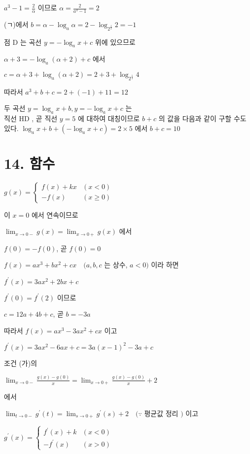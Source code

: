 \documentclass[10pt]{article}
\begin{document}
\(a^{3}-1=\frac{2}{\alpha}\) 이므로 \(\alpha=\frac{2}{a^{3}-1}=2\)

(ㄱ)에서 \(b=\alpha-\log _{a} \alpha=2-\log _{2^{\frac{1}{3}}} 2=-1\)

점 D 는 곡선 \(y=-\log _{a} x+c\) 위에 있으므로

\(\alpha+3=-\log _{a}(\alpha+2)+c\) 에서

\(c=\alpha+3+\log _{a}(\alpha+2)=2+3+\log _{2^{\frac{1}{3}}} 4\)

따라서 \(a^{3}+b+c=2+(-1)+11=12\)

두 곡선 \(y=\log _{a} x+b, y=-\log _{a} x+c\) 는\\
직선 HD , 곧 직선 \(y=5\) 에 대하여 대칭이므로 \(b+c\) 의 값을 다음과 같이 구할 수도 있다. \(\log _{a} x+b+\left(-\log _{a} x+c\right)=2 \times 5\) 에서 \(b+c=10\)

\section*{14. 함수}
\(g(x)= \begin{cases}f(x)+k x & (x<0) \\ -f(x) & (x \geq 0)\end{cases}\)

이 \(x=0\) 에서 연속이므로

\(\lim _{x \rightarrow 0-} g(x)=\lim _{x \rightarrow 0+} g(x)\) 에서

\(f(0)=-f(0)\), 곧 \(f(0)=0\)

\(f(x)=a x^{3}+b x^{2}+c x \quad(a, b, c\) 는 상수, \(a<0)\) 이라 하면

\(f^{\prime}(x)=3 a x^{2}+2 b x+c\)

\(f^{\prime}(0)=f^{\prime}(2)\) 이므로

\(c=12 a+4 b+c\), 곧 \(b=-3 a\)

따라서 \(f(x)=a x^{3}-3 a x^{2}+c x\) 이고

\(f^{\prime}(x)=3 a x^{2}-6 a x+c=3 a(x-1)^{2}-3 a+c\)

조건 (가)의

\(\lim _{x \rightarrow 0-} \frac{g(x)-g(0)}{x}=\lim _{x \rightarrow 0+} \frac{g(x)-g(0)}{x}+2\)

에서

\(\lim _{t \rightarrow 0-} g^{\prime}(t)=\lim _{s \rightarrow 0+} g^{\prime}(s)+2 \quad(\because\) 평균값 정리 \()\) 이고

\(g^{\prime}(x)= \begin{cases}f^{\prime}(x)+k & (x<0) \\ -f^{\prime}(x) & (x>0)\end{cases}\)
\end{document}
